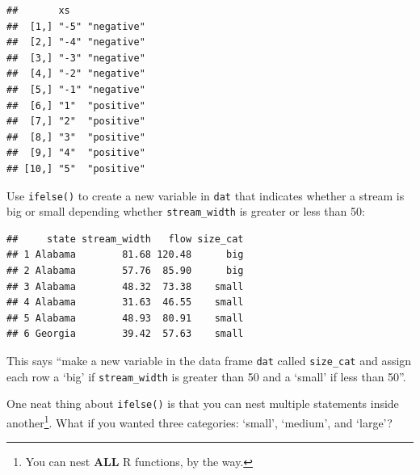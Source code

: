 \documentclass[]{book}
\newenvironment{Shaded}{\begin{snugshade}}{\end{snugshade}}
\newcommand{\KeywordTok}[1]{\textcolor[rgb]{0.13,0.29,0.53}{\textbf{#1}}}
\newcommand{\DecValTok}[1]{\textcolor[rgb]{0.00,0.00,0.81}{#1}}
\newcommand{\StringTok}[1]{\textcolor[rgb]{0.31,0.60,0.02}{#1}}
\newcommand{\OperatorTok}[1]{\textcolor[rgb]{0.81,0.36,0.00}{\textbf{#1}}}
\newcommand{\NormalTok}[1]{#1}
\let\rmarkdownfootnote\footnote%
\def\footnote{\protect\rmarkdownfootnote}
\theoremstyle{definition}
\theoremstyle{definition}
\theoremstyle{definition}
\theoremstyle{remark}
\begin{document}
\begin{verbatim}
##       xs             
##  [1,] "-5" "negative"
##  [2,] "-4" "negative"
##  [3,] "-3" "negative"
##  [4,] "-2" "negative"
##  [5,] "-1" "negative"
##  [6,] "1"  "positive"
##  [7,] "2"  "positive"
##  [8,] "3"  "positive"
##  [9,] "4"  "positive"
## [10,] "5"  "positive"
\end{verbatim}

Use \texttt{ifelse()} to create a new variable in \texttt{dat} that
indicates whether a stream is big or small depending whether
\texttt{stream\_width} is greater or less than 50:

\begin{Shaded}
\end{Shaded}

\begin{verbatim}
##     state stream_width   flow size_cat
## 1 Alabama        81.68 120.48      big
## 2 Alabama        57.76  85.90      big
## 3 Alabama        48.32  73.38    small
## 4 Alabama        31.63  46.55    small
## 5 Alabama        48.93  80.91    small
## 6 Georgia        39.42  57.63    small
\end{verbatim}

This says ``make a new variable in the data frame \texttt{dat} called
\texttt{size\_cat} and assign each row a `big' if \texttt{stream\_width}
is greater than 50 and a `small' if less than 50''.

One neat thing about \texttt{ifelse()} is that you can nest multiple
statements inside another\footnote{You can nest \textbf{ALL} R
  functions, by the way.}. What if you wanted three categories: `small',
`medium', and `large'?

\begin{Shaded}
\end{Shaded}
\end{document}
